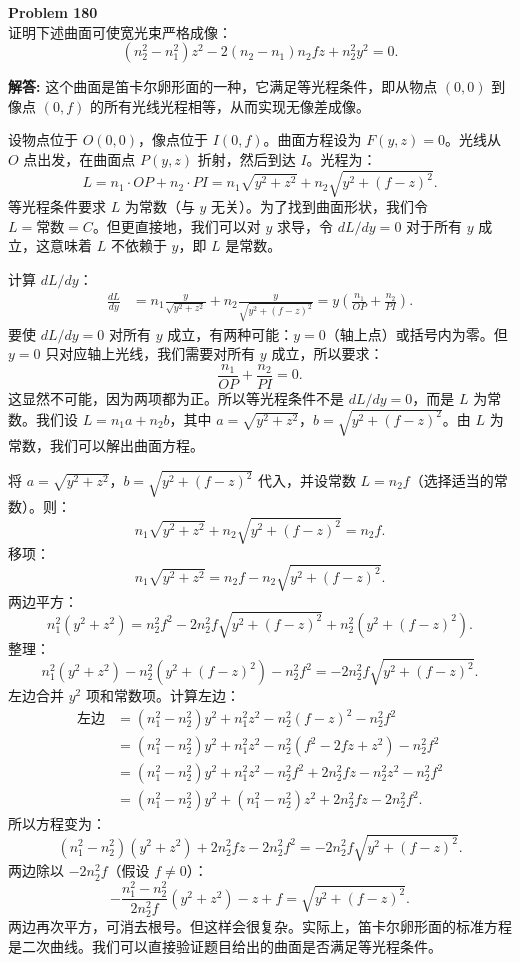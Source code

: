 \documentclass[12pt, a4paper, oneside]{ctexart}
\newenvironment{solution}{\par\noindent\textbf{解答:}\quad}{\par}
\begin{document}
\begin{mdframed}[backgroundcolor=gray!10, linewidth=0pt]
    \textbf{Problem 180} \\
    证明下述曲面可使宽光束严格成像：
    \[
    (n_2^2 - n_1^2) z^2 - 2(n_2 - n_1) n_2 f z + n_2^2 y^2 = 0.
    \]
\end{mdframed}
\begin{solution}
    这个曲面是笛卡尔卵形面的一种，它满足等光程条件，即从物点 $(0,0)$ 到像点 $(0,f)$ 的所有光线光程相等，从而实现无像差成像。

    设物点位于 $O(0,0)$，像点位于 $I(0,f)$。曲面方程设为 $F(y,z)=0$。光线从 $O$ 点出发，在曲面点 $P(y,z)$ 折射，然后到达 $I$。光程为：
    \[
    L = n_1 \cdot OP + n_2 \cdot PI = n_1 \sqrt{y^2 + z^2} + n_2 \sqrt{y^2 + (f-z)^2}.
    \]
    等光程条件要求 $L$ 为常数（与 $y$ 无关）。为了找到曲面形状，我们令 $L = \text{常数} = C$。但更直接地，我们可以对 $y$ 求导，令 $dL/dy = 0$ 对于所有 $y$ 成立，这意味着 $L$ 不依赖于 $y$，即 $L$ 是常数。

    计算 $dL/dy$：
    \begin{align*}
        \frac{dL}{dy} &= n_1 \frac{y}{\sqrt{y^2+z^2}} + n_2 \frac{y}{\sqrt{y^2+(f-z)^2}} = y \left( \frac{n_1}{OP} + \frac{n_2}{PI} \right).
    \end{align*}
    要使 $dL/dy = 0$ 对所有 $y$ 成立，有两种可能：$y=0$（轴上点）或括号内为零。但 $y=0$ 只对应轴上光线，我们需要对所有 $y$ 成立，所以要求：
    \[
    \frac{n_1}{OP} + \frac{n_2}{PI} = 0.
    \]
    这显然不可能，因为两项都为正。所以等光程条件不是 $dL/dy=0$，而是 $L$ 为常数。我们设 $L = n_1 a + n_2 b$，其中 $a = \sqrt{y^2+z^2}$，$b = \sqrt{y^2+(f-z)^2}$。由 $L$ 为常数，我们可以解出曲面方程。

    将 $a = \sqrt{y^2+z^2}$，$b = \sqrt{y^2+(f-z)^2}$ 代入，并设常数 $L = n_2 f$（选择适当的常数）。则：
    \[
    n_1 \sqrt{y^2+z^2} + n_2 \sqrt{y^2+(f-z)^2} = n_2 f.
    \]
    移项：
    \[
    n_1 \sqrt{y^2+z^2} = n_2 f - n_2 \sqrt{y^2+(f-z)^2}.
    \]
    两边平方：
    \[
    n_1^2 (y^2+z^2) = n_2^2 f^2 - 2 n_2^2 f \sqrt{y^2+(f-z)^2} + n_2^2 (y^2+(f-z)^2).
    \]
    整理：
    \[
    n_1^2 (y^2+z^2) - n_2^2 (y^2+(f-z)^2) - n_2^2 f^2 = -2 n_2^2 f \sqrt{y^2+(f-z)^2}.
    \]
    左边合并 $y^2$ 项和常数项。计算左边：
    \begin{align*}
        \text{左边} &= (n_1^2 - n_2^2) y^2 + n_1^2 z^2 - n_2^2 (f-z)^2 - n_2^2 f^2 \\
        &= (n_1^2 - n_2^2) y^2 + n_1^2 z^2 - n_2^2 (f^2 - 2fz + z^2) - n_2^2 f^2 \\
        &= (n_1^2 - n_2^2) y^2 + n_1^2 z^2 - n_2^2 f^2 + 2n_2^2 f z - n_2^2 z^2 - n_2^2 f^2 \\
        &= (n_1^2 - n_2^2) y^2 + (n_1^2 - n_2^2) z^2 + 2n_2^2 f z - 2n_2^2 f^2.
    \end{align*}
    所以方程变为：
    \[
    (n_1^2 - n_2^2)(y^2+z^2) + 2n_2^2 f z - 2n_2^2 f^2 = -2 n_2^2 f \sqrt{y^2+(f-z)^2}.
    \]
    两边除以 $-2n_2^2 f$（假设 $f \neq 0$）：
    \[
    -\frac{n_1^2 - n_2^2}{2n_2^2 f} (y^2+z^2) - z + f = \sqrt{y^2+(f-z)^2}.
    \]
    两边再次平方，可消去根号。但这样会很复杂。实际上，笛卡尔卵形面的标准方程是二次曲线。我们可以直接验证题目给出的曲面是否满足等光程条件。


\end{solution}
\end{document}
